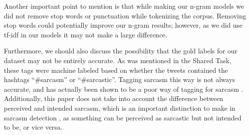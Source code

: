 \documentclass[11pt,a4paper]{article}
\begin{document}
Another important point to mention is that while making our n-gram models we did not remove stop words or punctuation while tokenizing the corpus. Removing stop words could
potentially improve our n-gram results; however, as we did use tf-idf in our models it may not make a large difference. 

Furthermore, we should also discuss the possibility that the gold labels for our dataset may not be entirely accurate. As was mentioned in the Shared Task, these tags were machine
labeled based on whether the tweets contained the hashtags ``\#sarcasm'' or ``\#sarcastic''. Tagging sarcasm this way is not always accurate, and has actually been shown to be a
poor way of tagging for sarcasm \cite{opreaiSarcasm}. Additionally, this paper does not take into account the difference between perceived and intended sarcasm, which is an important
distinction to make in sarcasm detection \cite{oprea}, as something can be perceived as sarcastic but not intended to be, or vice versa.






\end{document}
